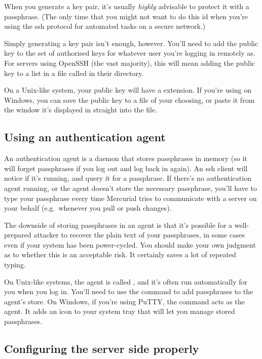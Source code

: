 When you generate a key pair, it's usually \emph{highly} advisable to
protect it with a passphrase.  (The only time that you might not want
to do this id when you're using the ssh protocol for automated tasks
on a secure network.)

Simply generating a key pair isn't enough, however.  You'll need to
add the public key to the set of authorised keys for whatever user
you're logging in remotely as.  For servers using OpenSSH (the vast
majority), this will mean adding the public key to a list in a file
called  in their 
directory.

On a Unix-like system, your public key will have a 
extension.  If you're using  on Windows, you can
save the public key to a file of your choosing, or paste it from the
window it's displayed in straight into the
 file.

\subsection{Using an authentication agent}

An authentication agent is a daemon that stores passphrases in memory
(so it will forget passphrases if you log out and log back in again).
An ssh client will notice if it's running, and query it for a
passphrase.  If there's no authentication agent running, or the agent
doesn't store the necessary passphrase, you'll have to type your
passphrase every time Mercurial tries to communicate with a server on
your behalf (e.g.~whenever you pull or push changes).

The downside of storing passphrases in an agent is that it's possible
for a well-prepared attacker to recover the plain text of your
passphrases, in some cases even if your system has been power-cycled.
You should make your own judgment as to whether this is an acceptable
risk.  It certainly saves a lot of repeated typing.

On Unix-like systems, the agent is called , and
it's often run automatically for you when you log in.  You'll need to
use the  command to add passphrases to the agent's
store.  On Windows, if you're using PuTTY, the 
command acts as the agent.  It adds an icon to your system tray that
will let you manage stored passphrases.

\subsection{Configuring the server side properly}

